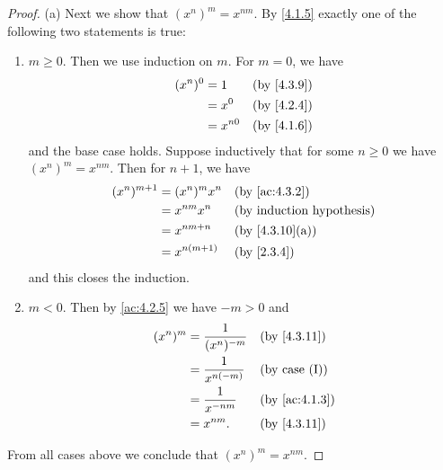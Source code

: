 \begin{proof}{(a)}
  Next we show that \((x^n)^m = x^{nm}\).
  By \cref{4.1.5} exactly one of the following two statements is true:
  \begin{enumerate}[label=(\Roman*)]
    \item \(m \geq 0\).
          Then we use induction on \(m\).
          For \(m = 0\), we have
          \begin{align*}
            (x^n)^0 & = 1      &  & \text{(by \cref{4.3.9})} \\
                    & = x^0    &  & \text{(by \cref{4.2.4})} \\
                    & = x^{n0} &  & \text{(by \cref{4.1.6})}
          \end{align*}
          and the base case holds.
          Suppose inductively that for some \(n \geq 0\) we have \((x^n)^m = x^{nm}\).
          Then for \(n + 1\), we have
          \begin{align*}
            (x^n)^{m + 1} & = (x^n)^m x^n  &  & \text{(by \cref{ac:4.3.2})}      \\
                          & = x^{nm} x^n   &  & \text{(by induction hypothesis)} \\
                          & = x^{nm + n}   &  & \text{(by \cref{4.3.10}(a))}     \\
                          & = x^{n(m + 1)} &  & \text{(by \cref{2.3.4})}
          \end{align*}
          and this closes the induction.
    \item \(m < 0\).
          Then by \cref{ac:4.2.5} we have \(-m > 0\) and
          \begin{align*}
            (x^n)^m & = \dfrac{1}{(x^n)^{-m}} &  & \text{(by \cref{4.3.11})}   \\
                    & = \dfrac{1}{x^{n(-m)}}  &  & \text{(by case (I))}        \\
                    & = \dfrac{1}{x^{-nm}}    &  & \text{(by \cref{ac:4.1.3})} \\
                    & = x^{nm}.               &  & \text{(by \cref{4.3.11})}
          \end{align*}
  \end{enumerate}
  From all cases above we conclude that \((x^n)^m = x^{nm}\).


\end{proof}

